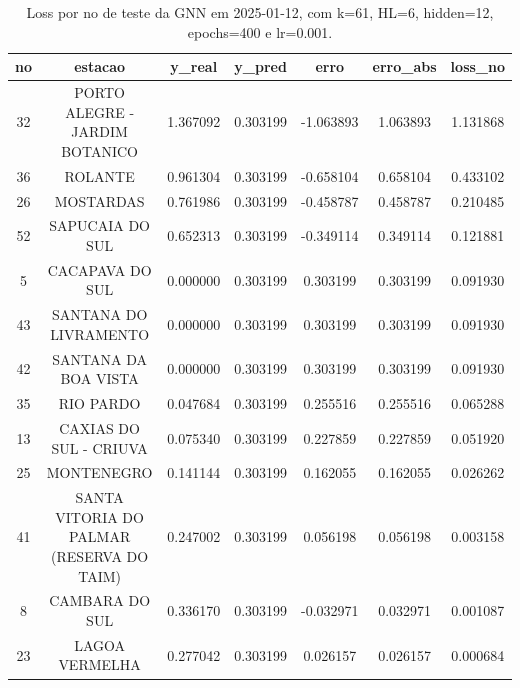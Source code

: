 \begin{table}[h]
\centering
\caption{Loss por no de teste da GNN em 2025-01-12, com k=61, HL=6, hidden=12, epochs=400 e lr=0.001.}
\label{tab:gnn_loss_k61_hl6_h12_e400_d20250112}
\begin{tabular}{ccccccc}
\toprule
no & estacao & y\_real & y\_pred & erro & erro\_abs & loss\_no \\
\midrule
32 & PORTO ALEGRE - JARDIM BOTANICO & 1.367092 & 0.303199 & -1.063893 & 1.063893 & 1.131868 \\
36 & ROLANTE & 0.961304 & 0.303199 & -0.658104 & 0.658104 & 0.433102 \\
26 & MOSTARDAS & 0.761986 & 0.303199 & -0.458787 & 0.458787 & 0.210485 \\
52 & SAPUCAIA DO SUL & 0.652313 & 0.303199 & -0.349114 & 0.349114 & 0.121881 \\
5 & CACAPAVA DO SUL & 0.000000 & 0.303199 & 0.303199 & 0.303199 & 0.091930 \\
43 & SANTANA DO LIVRAMENTO & 0.000000 & 0.303199 & 0.303199 & 0.303199 & 0.091930 \\
42 & SANTANA DA BOA VISTA & 0.000000 & 0.303199 & 0.303199 & 0.303199 & 0.091930 \\
35 & RIO PARDO & 0.047684 & 0.303199 & 0.255516 & 0.255516 & 0.065288 \\
13 & CAXIAS DO SUL - CRIUVA & 0.075340 & 0.303199 & 0.227859 & 0.227859 & 0.051920 \\
25 & MONTENEGRO & 0.141144 & 0.303199 & 0.162055 & 0.162055 & 0.026262 \\
41 & SANTA VITORIA DO PALMAR (RESERVA DO TAIM) & 0.247002 & 0.303199 & 0.056198 & 0.056198 & 0.003158 \\
8 & CAMBARA DO SUL & 0.336170 & 0.303199 & -0.032971 & 0.032971 & 0.001087 \\
23 & LAGOA VERMELHA & 0.277042 & 0.303199 & 0.026157 & 0.026157 & 0.000684 \\
\bottomrule
\end{tabular}
\end{table}

